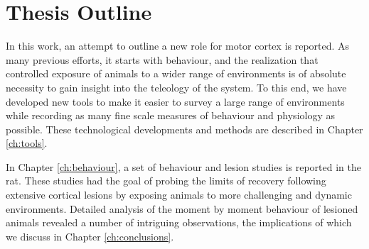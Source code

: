 \section{Thesis Outline}

In this work, an attempt to outline a new role for motor cortex is reported. As many previous efforts, it starts with behaviour, and the realization that controlled exposure of animals to a wider range of environments is of absolute necessity to gain insight into the teleology of the system. To this end, we have developed new tools to make it easier to survey a large range of environments while recording as many fine scale measures of behaviour and physiology as possible. These technological developments and methods are described in Chapter \ref{ch:tools}.

In Chapter \ref{ch:behaviour}, a set of behaviour and lesion studies is reported in the rat. These studies had the goal of probing the limits of recovery following extensive cortical lesions by exposing animals to more challenging and dynamic environments. Detailed analysis of the moment by moment behaviour of lesioned animals revealed a number of intriguing observations, the implications of which we discuss in Chapter \ref{ch:conclusions}.

